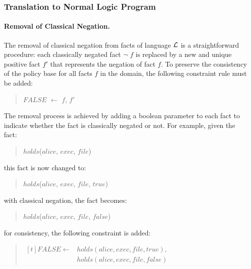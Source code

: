 \documentclass[10pt, twocolumn]{article}
\begin{document}
      \subsubsection{Translation to Normal Logic Program}

        \paragraph{Removal of Classical Negation.}

          The removal of classical negation from facts of language ${\cal L}$
          is a straightforward procedure: each classically negated fact
          $\lnot$ $f$ is replaced by a new and unique positive fact $f'$ that
          represents the negation of fact $f$. To preserve the consistency of
          the policy base for all facts $f$ in the domain, the following
          constraint rule must be added:

          \begin{quote}
            $FALSE$ $\leftarrow$ $f$, $f'$
          \end{quote}

          The removal process is achieved by adding a boolean parameter to
          each fact to indicate whether the fact is classically negated or
          not. For example, given the fact:

          \begin{quote}
            $holds$($alice$, $exec$, $file$)
          \end{quote}

          this fact is now changed to:

          \begin{quote}
            $holds$($alice$, $exec$, $file$, $true$)
          \end{quote}

          with classical negation, the fact becomes:

          \begin{quote}
            $holds$($alice$, $exec$, $file$, $false$)
          \end{quote}

          for consistency, the following constraint is added:

          \begin{quote}
            \begin{math}
              \begin{aligned}[t]
                FALSE \leftarrow & holds(alice, exec, file, true), \\
                & holds(alice, exec, file, false)
              \end{aligned}
            \end{math}
          \end{quote}
\end{document}

